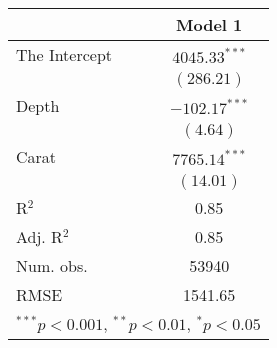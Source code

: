 \begin{tabular}{l c }
	\hline
	& Model 1 \\
	\hline
	The Intercept & $4045.33^{***}$ \\
	& $(286.21)$      \\
	Depth         & $-102.17^{***}$ \\
	& $(4.64)$        \\
	Carat         & $7765.14^{***}$ \\
	& $(14.01)$       \\
	\hline
	R$^2$         & 0.85            \\
	Adj. R$^2$    & 0.85            \\
	Num. obs.     & 53940           \\
	RMSE          & 1541.65         \\
	\hline
	\multicolumn{2}{l}{\scriptsize{$^{***}p<0.001$, $^{**}p<0.01$, $^*p<0.05$}}
\end{tabular}
